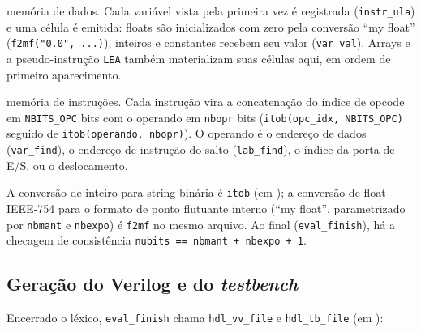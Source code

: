 \begin{description}[leftmargin=1.2em]
  \item[\file{<nome>\_data.mif}] memória de dados. Cada variável vista pela
    primeira vez é registrada (\lstinline|instr_ula|) e uma célula é emitida:
    floats são inicializados com zero pela conversão \enquote{my float}
    (\lstinline|f2mf("0.0", ...)|), inteiros e constantes recebem seu valor
    (\lstinline|var_val|). Arrays e a pseudo-instrução \lstinline|LEA| também
    materializam suas células aqui, em ordem de primeiro aparecimento.
  \item[\file{<nome>\_inst.mif}] memória de instruções. Cada instrução vira a
    concatenação do índice de opcode em \lstinline|NBITS_OPC| bits com o operando
    em \lstinline|nbopr| bits (\lstinline|itob(opc_idx, NBITS_OPC)| seguido de
    \lstinline|itob(operando, nbopr)|). O operando é o endereço de dados
    (\lstinline|var_find|), o endereço de instrução do salto
    (\lstinline|lab_find|), o índice da porta de E/S, ou o deslocamento.
\end{description}

A conversão de inteiro para string binária é \lstinline|itob| (em
); a conversão de float IEEE-754 para o formato de
ponto flutuante interno (\enquote{my float}, parametrizado por \lstinline|nbmant|
e \lstinline|nbexpo|) é \lstinline|f2mf| no mesmo arquivo. Ao final
(\lstinline|eval_finish|), há a checagem de consistência
\lstinline|nubits == nbmant + nbexpo + 1|.

\subsection{Geração do Verilog e do \emph{testbench}}
\label{sec:yanc-asmcomp-hdl}

Encerrado o léxico, \lstinline|eval_finish| chama \lstinline|hdl_vv_file| e
\lstinline|hdl_tb_file| (em ):

